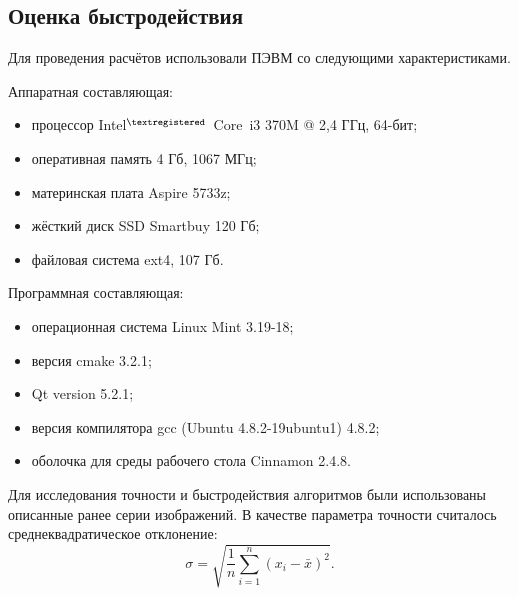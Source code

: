 \subsection {Оценка быстродействия}
Для проведения расчётов использовали ПЭВМ со следующими характеристиками.

Аппаратная составляющая:
\begin{itemize}
\item процессор Intel$^{\textregistered}$~Core\texttrademark~i3 370M @ 2,4 ГГц, 64-бит;
\item оперативная память 4 Гб, 1067 МГц;
\item материнская плата Aspire 5733z;
\item жёсткий диск SSD Smartbuy 120 Гб;
\item файловая система ext4, 107 Гб.
\end{itemize}

Программная составляющая:
\begin{itemize}
\item операционная система Linux Mint 3.19-18;
\item версия cmake 3.2.1;
\item Qt version 5.2.1;
\item версия компилятора gcc (Ubuntu 4.8.2-19ubuntu1) 4.8.2;
\item оболочка для среды рабочего стола Cinnamon 2.4.8.
\end{itemize}

Для исследования точности и быстродействия алгоритмов были использованы описанные ранее серии изображений. В  качестве параметра точности считалось среднеквадратическое отклонение:
$$\sigma=\sqrt{\frac{1}{n}\sum_{i=1}^n\left(x_i-\bar{x}\right)^2}.$$